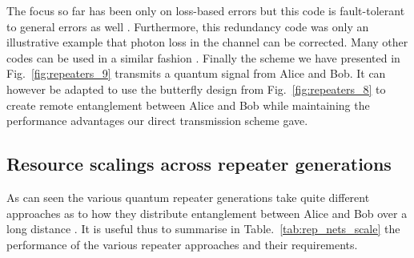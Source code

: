 \documentclass[twocolumn, aps, rmp, amsmath, amssymb, nofootinbib, superscriptaddress, longbibliography, floatfix, table-of-contents, eqsecnum]{revtex4-1}
\begin{document}
The focus so far has been only on loss-based errors but this code is fault-tolerant to general errors as well \cite{bib:MKLLJ14}. Furthermore, this redundancy code was only an illustrative example that photon loss in the channel can be corrected. Many other codes can be used in a similar fashion \cite{bib:munro12, bib:Fowler10, bib:MKLLJ14}. Finally the scheme we have presented in Fig.~\ref{fig:repeaters_9} transmits a quantum signal from Alice and Bob. It can however be adapted to use the butterfly design from Fig.~\ref{fig:repeaters_8} to create remote entanglement between Alice and Bob while maintaining the performance advantages our direct transmission scheme gave. 

\subsection{Resource scalings across repeater generations}

As can seen the various quantum repeater generations take quite different approaches as to how they distribute entanglement between Alice and Bob over a long distance \cite{bib:Muralidharan2016}. It is useful thus to summarise in Table.~\ref{tab:rep_nets_scale} the performance of the various repeater approaches and their requirements.
\end{document}

